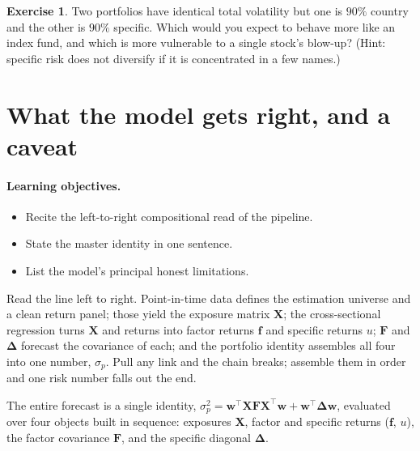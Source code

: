\documentclass[11pt]{article}
\theoremstyle{definition}
\newtheorem{exercise}{Exercise}[section]
\theoremstyle{plain}
\theoremstyle{remark}
\newcommand{\T}{^{\!\top}}
\newcommand{\wvec}{\mathbf{w}}
\newcommand{\Xmat}{\mathbf{X}}
\newcommand{\Fmat}{\mathbf{F}}
\newcommand{\Del}{\boldsymbol{\Delta}}
\newcommand{\fvec}{\mathbf{f}}
\begin{document}
\begin{exercise}
Two portfolios have identical total volatility but one is $90\%$ country and the other is $90\%$ specific. Which would you expect to behave more like an index fund, and which is more vulnerable to a single stock's blow-up? (Hint: specific risk does not diversify if it is concentrated in a few names.)
\end{exercise}

\section{What the model gets right, and a caveat}\label{sec:caveat}

\paragraph{Learning objectives.}
\begin{itemize}[leftmargin=1.4em,nosep]
  \item Recite the left-to-right compositional read of the pipeline.
  \item State the master identity in one sentence.
  \item List the model's principal honest limitations.
\end{itemize}

\begin{intuition}
Read the line left to right. Point-in-time data defines the estimation universe and a clean return panel; those yield the exposure matrix $\Xmat$; the cross-sectional regression turns $\Xmat$ and returns into factor returns $\fvec$ and specific returns $u$; $\Fmat$ and $\Del$ forecast the covariance of each; and the portfolio identity assembles all four into one number, $\sigma_p$. Pull any link and the chain breaks; assemble them in order and one risk number falls out the end.
\end{intuition}

\begin{keyresult}
The entire forecast is a single identity, $\sigma_p^2 = \wvec\T\Xmat\Fmat\Xmat\T\wvec + \wvec\T\Del\wvec$, evaluated over four objects built in sequence: exposures $\Xmat$, factor and specific returns ($\fvec$, $u$), the factor covariance $\Fmat$, and the specific diagonal $\Del$.
\end{keyresult}
\end{document}
